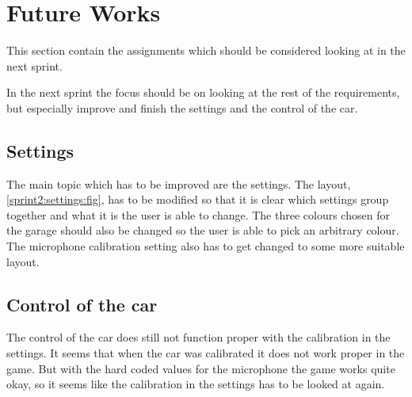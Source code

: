 \section{Future Works}
This section contain the assignments which should be considered looking at in the next sprint.

In the next sprint the focus should be on looking at the rest of the requirements, but especially improve and finish the settings and the control of the car.

\subsection{Settings}
The main topic which has to be improved are the settings.
The layout, \cref{sprint2:settings:fig}, has to be modified so that it is clear which settings group together and what it is the user is able to change.
The three colours chosen for the garage should also be changed so the user is able to pick an arbitrary colour.
The microphone calibration setting also has to get changed to some more suitable layout.

\subsection{Control of the car}
The control of the car does still not function proper with the calibration in the settings.
It seems that when the car was calibrated it does not work proper in the game.
But with the hard coded values for the microphone the game works quite okay, so it seems like the calibration in the settings has to be looked at again.